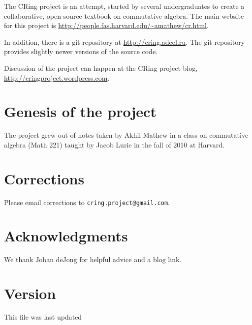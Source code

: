 The CRing project is an attempt, started by several undergraduates to create
a collaborative, open-source textbook on commutative algebra. The main website for this project is 
\url{http://people.fas.harvard.edu/~amathew/cr.html}.

In addition, there is a
git repository at \url{http://cring.adeel.ru}. The git repository provides 
slightly newer versions of the source code.

Discussion of the project can happen at the CRing project blog,
\url{http://cringproject.wordpress.com}.

\section*{Genesis of the project}
The project grew out of notes taken by Akhil Mathew in a class on commutative
algebra (Math 221) taught by Jacob Lurie in the fall of 2010 at Harvard.  


\section*{Corrections}
Please email corrections to
\verb=cring.project@gmail.com=.

\section*{Acknowledgments}

We thank Johan deJong for helpful advice and a blog link.


\section*{Version}
This file was last updated 


